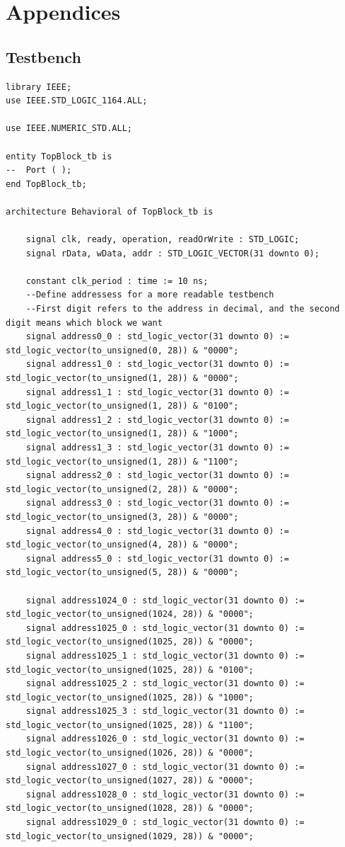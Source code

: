 \documentclass{article}
\begin{document}
\section{Appendices}
\subsection{Testbench}
\begin{lstlisting}
library IEEE;
use IEEE.STD_LOGIC_1164.ALL;

use IEEE.NUMERIC_STD.ALL;

entity TopBlock_tb is
--  Port ( );
end TopBlock_tb;

architecture Behavioral of TopBlock_tb is

    signal clk, ready, operation, readOrWrite : STD_LOGIC;
    signal rData, wData, addr : STD_LOGIC_VECTOR(31 downto 0);

    constant clk_period : time := 10 ns;
    --Define addressess for a more readable testbench
    --First digit refers to the address in decimal, and the second digit means which block we want
    signal address0_0 : std_logic_vector(31 downto 0) := std_logic_vector(to_unsigned(0, 28)) & "0000";
    signal address1_0 : std_logic_vector(31 downto 0) := std_logic_vector(to_unsigned(1, 28)) & "0000";
    signal address1_1 : std_logic_vector(31 downto 0) := std_logic_vector(to_unsigned(1, 28)) & "0100";
    signal address1_2 : std_logic_vector(31 downto 0) := std_logic_vector(to_unsigned(1, 28)) & "1000";
    signal address1_3 : std_logic_vector(31 downto 0) := std_logic_vector(to_unsigned(1, 28)) & "1100";
    signal address2_0 : std_logic_vector(31 downto 0) := std_logic_vector(to_unsigned(2, 28)) & "0000";
    signal address3_0 : std_logic_vector(31 downto 0) := std_logic_vector(to_unsigned(3, 28)) & "0000";
    signal address4_0 : std_logic_vector(31 downto 0) := std_logic_vector(to_unsigned(4, 28)) & "0000";
    signal address5_0 : std_logic_vector(31 downto 0) := std_logic_vector(to_unsigned(5, 28)) & "0000";
    
    signal address1024_0 : std_logic_vector(31 downto 0) := std_logic_vector(to_unsigned(1024, 28)) & "0000";
    signal address1025_0 : std_logic_vector(31 downto 0) := std_logic_vector(to_unsigned(1025, 28)) & "0000";
    signal address1025_1 : std_logic_vector(31 downto 0) := std_logic_vector(to_unsigned(1025, 28)) & "0100";
    signal address1025_2 : std_logic_vector(31 downto 0) := std_logic_vector(to_unsigned(1025, 28)) & "1000";
    signal address1025_3 : std_logic_vector(31 downto 0) := std_logic_vector(to_unsigned(1025, 28)) & "1100";
    signal address1026_0 : std_logic_vector(31 downto 0) := std_logic_vector(to_unsigned(1026, 28)) & "0000";
    signal address1027_0 : std_logic_vector(31 downto 0) := std_logic_vector(to_unsigned(1027, 28)) & "0000";
    signal address1028_0 : std_logic_vector(31 downto 0) := std_logic_vector(to_unsigned(1028, 28)) & "0000";
    signal address1029_0 : std_logic_vector(31 downto 0) := std_logic_vector(to_unsigned(1029, 28)) & "0000";


\end{lstlisting}
\end{document}
